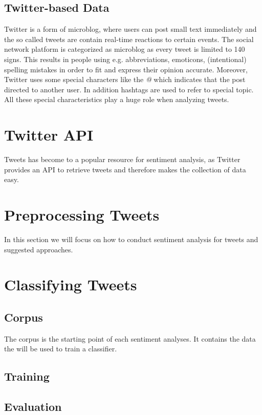 \documentclass{acm_proc_article-sp}
\begin{document}
\subsection{Twitter-based Data}
Twitter is a form of microblog, where users can post small text immediately and the so called tweets are contain real-time reactions to certain events. The social network platform is categorized as microblog as every tweet is limited to 140 signs. This results in people using e.g. abbreviations, emoticons, (intentional) spelling mistakes in order to fit and express their opinion accurate. Moreover, Twitter uses some special characters like the \emph{@} which indicates that the post directed to another user. In addition hashtags are used to refer to special topic. All these special characteristics play a huge role when analyzing tweets. \cite{agarwal2011sentiment, read2005using}


\section{Twitter API} \label{twitterapi}
Tweets has become to a popular resource for sentiment analysis, as Twitter provides an API to retrieve tweets and therefore makes the collection of data easy.


\section{Preprocessing Tweets} \label{preprocessing}
In this section we will focus on how to conduct sentiment analysis for tweets and suggested approaches.



\section{Classifying Tweets} \label{classification}

\subsection{Corpus}
The corpus is the starting point of each sentiment analyses. It contains the data the will be used to train a classifier.


\subsection{Training}

\subsection{Evaluation}
\end{document}

